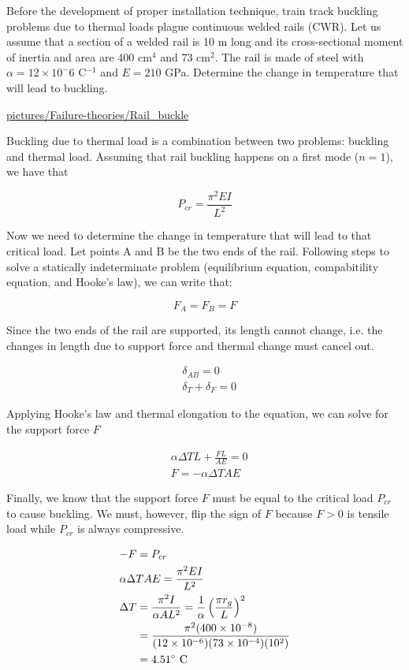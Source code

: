 \documentclass[a4paper,openany,12pt]{book}
\begin{document}
{{Before the development of proper installation technique, train track
buckling problems due to thermal loads plague continuous welded rails
(CWR). Let us assume that a section of a welded rail is 10 m long and
its cross-sectional moment of inertia and area are 400 cm\(^4\) and 73
cm\(^2\). The rail is made of steel with \(\alpha = 12 \times 10^-6\)
C\(^{-1}\) and \(E = 210\) GPa. Determine the change in temperature that
will lead to buckling.


\url{pictures/Failure-theories/Rail\_buckle}

Buckling due to thermal load is a combination between two problems:
buckling and thermal load. Assuming that rail buckling happens on a
first mode (\(n = 1\)), we have that

\begin{equation}
  P_{cr} = \frac{ \pi^2 EI }{ L^2 } 
\end{equation}

Now we need to determine the change in temperature that will lead to
that critical load. Let points A and B be the two ends of the rail.
Following steps to solve a statically indeterminate problem (equilibrium
equation, compabitility equation, and Hooke's law), we can write that:

\begin{equation*}
  F_A = F_B = F
\end{equation*}

Since the two ends of the rail are supported, its length cannot change,
i.e. the changes in length due to support force and thermal change must
cancel out.

\begin{gather*}
  &\delta_{AB} = 0 \\
  &\delta_T + \delta_F = 0
\end{gather*}

Applying Hooke's law and thermal elongation to the equation, we can
solve for the support force \(F\)

\begin{align*}
  &\alpha \Delta T L + \frac {FL}{AE} = 0 \\
  &F = -\alpha \Delta T A E
\end{align*}

Finally, we know that the support force \(F\) must be equal to the
critical load \(P_{cr}\) to cause buckling. We must, however, flip the
sign of \(F\) because \(F > 0\) is tensile load while \(P_{cr}\) is always
compressive.

\begin{gather*}
  -F = P_{cr} \hfill \\
  \alpha \Delta T A E = \frac{ \pi^2 EI }{ L^2 } \hfill \\
  \begin{aligned}
    \Delta T &= \frac{ \pi^2 I }{ \alpha A L^2} = \frac{1}{\alpha} \left( \frac{ \pi r_g }{L} \right)^2 \\
    &= \frac{ \pi^2 (400 \times 10^{-8}) }{ (12 \times 10^{-6})(73 \times 10^{-4})(10^2)}\\
    &= 4.51^{\circ} \text{ C}
   \end{aligned}
\end{gather*}

}}
\end{document}
